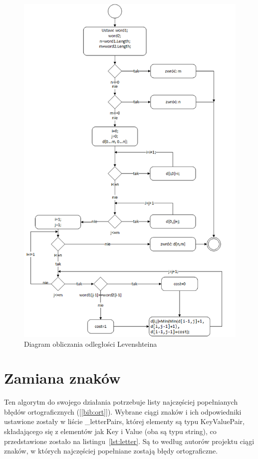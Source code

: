 \begin{figure} [H]
	\centering
	\includegraphics[width=1\linewidth]{rozdzial02/Levenstein-Count.png}
	\caption{Diagram obliczania odległości Levenshteina}
	\label{fig:Lev-Count}
\end{figure}


\section{Zamiana znaków}
\label{chap:Letter}
Ten algorytm do swojego działania potrzebuje listy najczęściej popełnianych błędów ortograficznych ([\ref{bib:ort}]). Wybrane ciągi znaków i ich odpowiedniki ustawione zostały w liście \_letterPairs, której elementy są typu KeyValuePair, składającego się z elementów jak Key i Value (oba są typu string), co przedstawione zostało na listingu~\ref{lst:letter}. Są to według autorów projektu ciągi znaków, w których najczęściej popełniane zostają błędy ortograficzne. 

